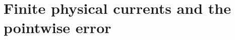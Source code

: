 \documentclass[11pt,reqno]{amsart}
\numberwithin{equation}{section}
\theoremstyle{definition}\newtheorem{definition}[theorem]{Definition}
\theoremstyle{remark}\newtheorem{remark}[theorem]{Remark}
\theoremstyle{definition}\newtheorem{inputstatement}[theorem]{Input statement}
\begin{document}





\part{Finite physical currents and the pointwise error}






\clearpage


\end{document}
